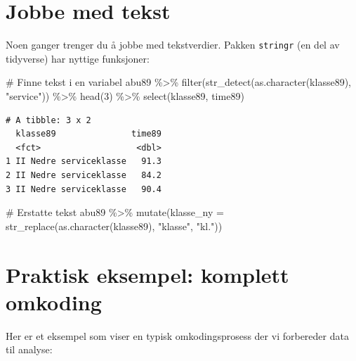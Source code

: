 \documentclass[
  norsk,
  letterpaper,
  DIV=11,
  numbers=noendperiod]{scrreprt}
\newenvironment{Shaded}{\begin{snugshade}}{\end{snugshade}}
\newcommand{\AttributeTok}[1]{\textcolor[rgb]{0.40,0.45,0.13}{#1}}
\newcommand{\CommentTok}[1]{\textcolor[rgb]{0.37,0.37,0.37}{#1}}
\newcommand{\DecValTok}[1]{\textcolor[rgb]{0.68,0.00,0.00}{#1}}
\newcommand{\FunctionTok}[1]{\textcolor[rgb]{0.28,0.35,0.67}{#1}}
\newcommand{\NormalTok}[1]{\textcolor[rgb]{0.00,0.23,0.31}{#1}}
\newcommand{\SpecialCharTok}[1]{\textcolor[rgb]{0.37,0.37,0.37}{#1}}
\newcommand{\StringTok}[1]{\textcolor[rgb]{0.13,0.47,0.30}{#1}}
\theoremstyle{definition}
\theoremstyle{remark}
\begin{document}
\section{Jobbe med tekst}\label{jobbe-med-tekst}

Noen ganger trenger du å jobbe med tekstverdier. Pakken \texttt{stringr}
(en del av tidyverse) har nyttige funksjoner:

\begin{Shaded}
\begin{Highlighting}[]
\CommentTok{\# Finne tekst i en variabel}
\NormalTok{abu89 }\SpecialCharTok{\%\textgreater{}\%}
  \FunctionTok{filter}\NormalTok{(}\FunctionTok{str\_detect}\NormalTok{(}\FunctionTok{as.character}\NormalTok{(klasse89), }\StringTok{"service"}\NormalTok{)) }\SpecialCharTok{\%\textgreater{}\%}
  \FunctionTok{head}\NormalTok{(}\DecValTok{3}\NormalTok{) }\SpecialCharTok{\%\textgreater{}\%}
  \FunctionTok{select}\NormalTok{(klasse89, time89)}
\end{Highlighting}
\end{Shaded}

\begin{verbatim}
# A tibble: 3 x 2
  klasse89               time89
  <fct>                   <dbl>
1 II Nedre serviceklasse   91.3
2 II Nedre serviceklasse   84.2
3 II Nedre serviceklasse   90.4
\end{verbatim}

\begin{Shaded}
\begin{Highlighting}[]
\CommentTok{\# Erstatte tekst}
\NormalTok{abu89 }\SpecialCharTok{\%\textgreater{}\%}
  \FunctionTok{mutate}\NormalTok{(}\AttributeTok{klasse\_ny =} \FunctionTok{str\_replace}\NormalTok{(}\FunctionTok{as.character}\NormalTok{(klasse89), }\StringTok{"klasse"}\NormalTok{, }\StringTok{"kl."}\NormalTok{))}
\end{Highlighting}
\end{Shaded}

\section{Praktisk eksempel: komplett
omkoding}\label{praktisk-eksempel-komplett-omkoding}

Her er et eksempel som viser en typisk omkodingsprosess der vi
forbereder data til analyse:
\end{document}
